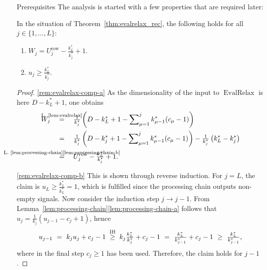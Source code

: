 \documentclass[journal]{IEEEtran}
\makeatletter
\def\subsubsection{\@startsection{subsubsection} {3} {\z@} {1.5ex plus 1.5ex minus 0.5ex} {0.7ex plus .5ex minus 0ex} {\normalfont\normalsize\itshape}}
\newcommand{\discint}[2]{\{#1,\dotsc,#2\}}
\newcommand{\inint}[2]{\in\discint{#1}{#2}}
\newcommand{\row}{\operatorname{row}}
\newcommand{\equsing}[1]{\overset{\mathclap{\text{#1}}}{=}}
\newcommand{\gequsing}[1]{\overset{\mathclap{\text{#1}}}{\geq}}
\DeclareMathOperator{\EvalRelax}{EvalRelax}
\makeatother
\begin{document}
\subsubsection{Prerequisites}
The analysis is started with a few properties that are required later:
\begin{remark}
\label{rem:evalrelax-comp}
In the situation of Theorem~\ref{thm:evalrelax_rec}, the following holds for all $j\inint{1}{L}$:
\begin{enumerate}
  \item \label{rem:evalrelax-comp-a} $W_j = U_j^{\row} - \frac{k_L^*}{k_j^*} + 1$.
  \item \label{rem:evalrelax-comp-b} $u_j \geq \frac{k_L^*}{k_j^*}$.
\end{enumerate}
\end{remark}\begin{proof}
\ref{rem:evalrelax-comp-a}
As the dimensionality of the input to $\EvalRelax$ is here $D - k_L^* + 1$, one obtains
\begin{align*}
  W_j\ \ \ &\equsing{L.~\ref{lem:evalrelax}}\ \ \ \tfrac{1}{k_j^*}\left(D - k_L^* + 1 - \sum\nolimits_{\mu = 1}^j k_{\mu - 1}^*(c_\mu - 1)\right)\\
  &=\ \ \ \tfrac{1}{k_j^*}\left(D - k_j^* + 1 - \sum\nolimits_{\mu = 1}^j k_{\mu - 1}^*(c_\mu - 1)\right) - \tfrac{1}{k_j^*}\left(k_L^* - k_j^*\right)\\
  &\equsing{L.~\ref{lem:processing-chain}\ref{lem:processing-chain-b}}\ \ \ U_j^{\row} - \tfrac{k_L^*}{k_j^*} + 1\text{.}
\end{align*}

\ref{rem:evalrelax-comp-b}
This is shown through reverse induction.
For $j = L$, the claim is $u_L \geq \frac{k_L^*}{k_L^*} = 1$, which is fulfilled since the processing chain outputs non-empty signals.
Now consider the induction step $j \to j - 1$.
From Lemma~\ref{lem:processing-chain}\ref{lem:processing-chain-a} follows that $u_j = \frac{1}{k_j}(u_{j - 1} - c_j + 1)$, hence
\begin{displaymath}
  u_{j - 1}
  \ =\  k_j u_j + c_j - 1
  \ \gequsing{IH}\ k_j \tfrac{k_L^*}{k_j^*} + c_j - 1
  \ =\ \tfrac{k_L^*}{k_{j - 1}^*} + c_j - 1
  \ \geq\ \tfrac{k_L^*}{k_{j - 1}^*}\text{,}
\end{displaymath}
where in the final step $c_j \geq 1$ has been used.
Therefore, the claim holds for $j - 1$.
\end{proof}
\end{document}
